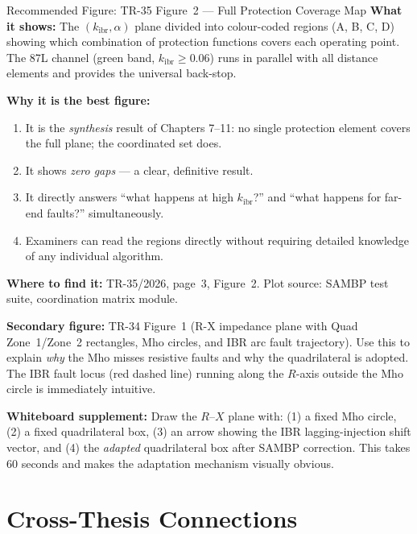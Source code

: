 \documentclass[12pt,a4paper]{article}
\newcommand{\kibr}{k_\mathrm{ibr}}
\begin{document}
\begin{keybox}{Recommended Figure: TR-35 Figure~2 --- Full Protection Coverage Map}
\textbf{What it shows:} The $(\kibr, \alpha)$ plane divided into colour-coded regions (A, B, C, D) showing which combination of protection functions covers each operating point. The 87L channel (green band, $\kibr \geq 0.06$) runs in parallel with all distance elements and provides the universal back-stop.

\textbf{Why it is the best figure:}
\begin{enumerate}[nosep]
  \item It is the \emph{synthesis} result of Chapters 7--11: no single protection element covers the full plane; the coordinated set does.
  \item It shows \emph{zero gaps} --- a clear, definitive result.
  \item It directly answers ``what happens at high $\kibr$?'' and ``what happens for far-end faults?'' simultaneously.
  \item Examiners can read the regions directly without requiring detailed knowledge of any individual algorithm.
\end{enumerate}

\textbf{Where to find it:} TR-35/2026, page~3, Figure~2. Plot source: SAMBP test suite, coordination matrix module.

\textbf{Secondary figure:} TR-34 Figure~1 (R-X impedance plane with Quad Zone~1/Zone~2 rectangles, Mho circles, and IBR arc fault trajectory). Use this to explain \emph{why} the Mho misses resistive faults and why the quadrilateral is adopted. The IBR fault locus (red dashed line) running along the $R$-axis outside the Mho circle is immediately intuitive.

\textbf{Whiteboard supplement:} Draw the $R$--$X$ plane with: (1) a fixed Mho circle, (2) a fixed quadrilateral box, (3) an arrow showing the IBR lagging-injection shift vector, and (4) the \emph{adapted} quadrilateral box after SAMBP correction. This takes 60 seconds and makes the adaptation mechanism visually obvious.
\end{keybox}

\section{Cross-Thesis Connections}
\end{document}
